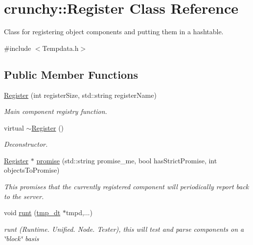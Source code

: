 \hypertarget{classcrunchy_1_1_register}{}\section{crunchy\+:\+:Register Class Reference}
\label{classcrunchy_1_1_register}


Class for registering object components and putting them in a hashtable.  




{\ttfamily \#include $<$Tempdata.\+h$>$}

\subsection*{Public Member Functions}
\begin{DoxyCompactItemize}
\item 
\hyperlink{classcrunchy_1_1_register_a763cad20437e64d7e9d5558308c68419}{Register} (int register\+Size, std\+::string register\+Name)
\begin{DoxyCompactList}\small\item\em Main component registry function. \end{DoxyCompactList}\item 
virtual \hyperlink{classcrunchy_1_1_register_aca2c03eb24beba0b762db96f5471299c}{$\sim$\+Register} ()
\begin{DoxyCompactList}\small\item\em Deconstructor. \end{DoxyCompactList}\item 
\hyperlink{classcrunchy_1_1_register}{Register} $\ast$ \hyperlink{classcrunchy_1_1_register_a79c811f0a0c0150b2bf12788963e1012}{promise} (std\+::string promise\+\_\+me, bool has\+Strict\+Promise, int objects\+To\+Promise)
\begin{DoxyCompactList}\small\item\em This promises that the currently registered component will periodically report back to the server. \end{DoxyCompactList}\item 
void \hyperlink{classcrunchy_1_1_register_a3cc81983d4be4f35dc219dda5b890624}{runt} (\hyperlink{structtmp__dt}{tmp\+\_\+dt} $\ast$tmpd,...)
\begin{DoxyCompactList}\small\item\em runt (Runtime. Unified. Node. Tester), this will test and parse components on a \char`\"{}block\char`\"{} basis \end{DoxyCompactList}\item 

\end{DoxyCompactItemize}
